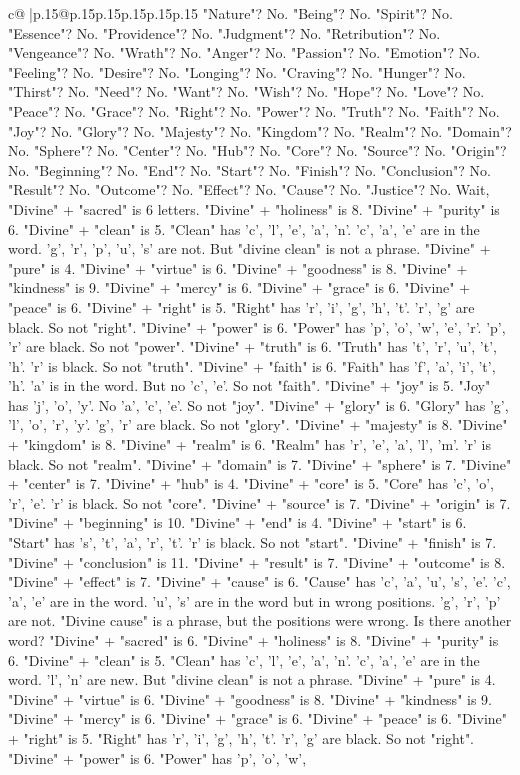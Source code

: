 \documentclass{article}
\begin{document}
{\begin{supertabular}{c@{$\;$}|p{.15\linewidth}@{}p{.15\linewidth}p{.15\linewidth}p{.15\linewidth}p{.15\linewidth}p{.15\linewidth}}
{{{"Nature"? No. "Being"? No. "Spirit"? No. "Essence"? No. "Providence"? No. "Judgment"? No. "Retribution"? No. "Vengeance"? No. "Wrath"? No. "Anger"? No. "Passion"? No. "Emotion"? No. "Feeling"? No. "Desire"? No. "Longing"? No. "Craving"? No. "Hunger"? No. "Thirst"? No. "Need"? No. "Want"? No. "Wish"? No. "Hope"? No. "Love"? No. "Peace"? No. "Grace"? No. "Right"? No. "Power"? No. "Truth"? No. "Faith"? No. "Joy"? No. "Glory"? No. "Majesty"? No. "Kingdom"? No. "Realm"? No. "Domain"? No. "Sphere"? No. "Center"? No. "Hub"? No. "Core"? No. "Source"? No. "Origin"? No. "Beginning"? No. "End"? No. "Start"? No. "Finish"? No. "Conclusion"? No. "Result"? No. "Outcome"? No. "Effect"? No. "Cause"? No. "Justice"? No. Wait, "Divine" + "sacred" is 6 letters. "Divine" + "holiness" is 8. "Divine" + "purity" is 6. "Divine" + "clean" is 5. "Clean" has 'c', 'l', 'e', 'a', 'n'. 'c', 'a', 'e' are in the word. 'g', 'r', 'p', 'u', 's' are not. But "divine clean" is not a phrase. "Divine" + "pure" is 4. "Divine" + "virtue" is 6. "Divine" + "goodness" is 8. "Divine" + "kindness" is 9. "Divine" + "mercy" is 6. "Divine" + "grace" is 6. "Divine" + "peace" is 6. "Divine" + "right" is 5. "Right" has 'r', 'i', 'g', 'h', 't'. 'r', 'g' are black. So not "right". "Divine" + "power" is 6. "Power" has 'p', 'o', 'w', 'e', 'r'. 'p', 'r' are black. So not "power". "Divine" + "truth" is 6. "Truth" has 't', 'r', 'u', 't', 'h'. 'r' is black. So not "truth". "Divine" + "faith" is 6. "Faith" has 'f', 'a', 'i', 't', 'h'. 'a' is in the word. But no 'c', 'e'. So not "faith". "Divine" + "joy" is 5. "Joy" has 'j', 'o', 'y'. No 'a', 'c', 'e'. So not "joy". "Divine" + "glory" is 6. "Glory" has 'g', 'l', 'o', 'r', 'y'. 'g', 'r' are black. So not "glory". "Divine" + "majesty" is 8. "Divine" + "kingdom" is 8. "Divine" + "realm" is 6. "Realm" has 'r', 'e', 'a', 'l', 'm'. 'r' is black. So not "realm". "Divine" + "domain" is 7. "Divine" + "sphere" is 7. "Divine" + "center" is 7. "Divine" + "hub" is 4. "Divine" + "core" is 5. "Core" has 'c', 'o', 'r', 'e'. 'r' is black. So not "core". "Divine" + "source" is 7. "Divine" + "origin" is 7. "Divine" + "beginning" is 10. "Divine" + "end" is 4. "Divine" + "start" is 6. "Start" has 's', 't', 'a', 'r', 't'. 'r' is black. So not "start". "Divine" + "finish" is 7. "Divine" + "conclusion" is 11. "Divine" + "result" is 7. "Divine" + "outcome" is 8. "Divine" + "effect" is 7. "Divine" + "cause" is 6. "Cause" has 'c', 'a', 'u', 's', 'e'. 'c', 'a', 'e' are in the word. 'u', 's' are in the word but in wrong positions. 'g', 'r', 'p' are not. "Divine cause" is a phrase, but the positions were wrong. Is there another word? "Divine" + "sacred" is 6. "Divine" + "holiness" is 8. "Divine" + "purity" is 6. "Divine" + "clean" is 5. "Clean" has 'c', 'l', 'e', 'a', 'n'. 'c', 'a', 'e' are in the word. 'l', 'n' are new. But "divine clean" is not a phrase. "Divine" + "pure" is 4. "Divine" + "virtue" is 6. "Divine" + "goodness" is 8. "Divine" + "kindness" is 9. "Divine" + "mercy" is 6. "Divine" + "grace" is 6. "Divine" + "peace" is 6. "Divine" + "right" is 5. "Right" has 'r', 'i', 'g', 'h', 't'. 'r', 'g' are black. So not "right". "Divine" + "power" is 6. "Power" has 'p', 'o', 'w', }}}
\end{supertabular}}
\end{document}

